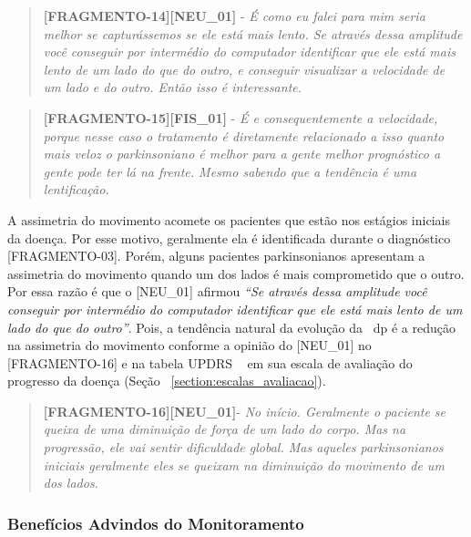 \begin{quote}
\textbf{[FRAGMENTO-14][NEU\_01]} - 
\emph{
É como eu falei para mim seria melhor se capturássemos se ele está mais lento. Se através dessa amplitude você conseguir por intermédio do computador identificar que ele está mais lento de um lado do que do outro, e conseguir visualizar a velocidade de um lado e do outro. Então isso é interessante.
}
\end{quote}


\begin{quote}
\textbf{[FRAGMENTO-15][FIS\_01]} - 
\emph{
É e consequentemente a velocidade, porque nesse caso o tratamento é diretamente relacionado a isso quanto mais veloz o parkinsoniano é melhor para a gente melhor prognóstico a gente pode ter lá na frente. Mesmo sabendo que a tendência é uma lentificação.
}
\end{quote}


A assimetria do movimento acomete os pacientes que estão nos estágios iniciais da doença. Por esse motivo, geralmente ela é identificada durante o diagnóstico [FRAGMENTO-03]. Porém, alguns pacientes parkinsonianos apresentam a assimetria do movimento quando um dos lados é mais comprometido que o outro. Por essa razão é que o [NEU\_01] afirmou \textit{``Se através dessa amplitude você conseguir por intermédio do computador identificar que ele está mais lento de um lado do que do outro''}. Pois, a tendência natural da evolução da ~\ac{dp} é a redução na assimetria do movimento conforme a opinião do [NEU\_01] no [FRAGMENTO-16] e na tabela UPDRS ~\cite{updrs87} em sua escala de avaliação do progresso da doença (Seção ~\ref{section:escalas_avaliacao}).

\begin{quote}
\textbf{[FRAGMENTO-16][NEU\_01]}-
\emph{
No início. Geralmente o paciente se queixa de uma diminuição de força de um lado do corpo. Mas na progressão, ele vai sentir dificuldade global. Mas aqueles parkinsonianos iniciais geralmente eles se queixam na diminuição do movimento de um dos lados.
}
\end{quote}

\subsubsection{Benefícios Advindos do Monitoramento}


